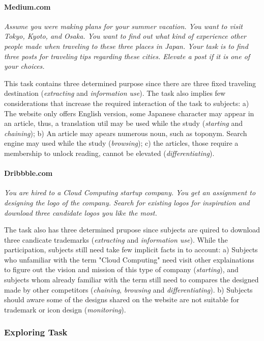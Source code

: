 \paragraph{Medium.com} \emph{Assume you were making plans for your summer vacation. 
        You want to visit Tokyo, Kyoto, and Osaka. You want to find out what kind of experience other people made 
        when traveling to these three places in Japan. Your task is to find three posts 
        for traveling tips regarding these cities. Elevate a post if it is one of your choices.}

This task contains three determined purpose since there are three fixed traveling destination (\emph{extracting} and \emph{information use}).
The task also implies few considerations that increase the required interaction of the task to subjects:
a) The website only offers English version, some Japanese character may appear in an article,
thus, a translation util may be used while the study (\emph{starting} and \emph{chaining});
b) An article may apears numerous noun, such as toponym. Search engine may used while the study (\emph{browsing});
c) the articles, those require a membership to unlock reading, cannot be elevated (\emph{differentiating}). 

\paragraph{Dribbble.com} \emph{You are hired to a Cloud Computing startup company. You get an assignment to 
        designing the logo of the company. Search for existing logos for inspiration and 
        download three candidate logos you like the most.}

The task also has three determined prupose since subjects are quired to download three candicate trademarks (\emph{extracting} and \emph{information use}).
While the participation, subjects still need take few implicit facts in to account:
a) Subjects who unfamiliar with the term "Cloud Computing" need visit other explainations to figure out
the vision and mission of this type of company (\emph{starting}), and subjects whom already familiar with the term
still need to compares the designed made by other competitors (\emph{chaining}, \emph{browsing} and \emph{differentiating}).
b) Subjects should aware some of the designs shared on the website are not suitable for trademark or icon design (\emph{monitoring}).

\subsubsection{Exploring Task}

